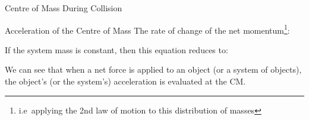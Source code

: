 \documentclass[12pt,compress,aspectratio=169]{beamer}
\begin{document}
\begin{frame}{Centre of Mass During Collision}
\begin{center}
    \vspace{.3in}
  \end{center}
\end{frame}


\begin{frame}{Acceleration of the Centre of Mass}
  The rate of change of the net momentum\footnote{i.e\ applying the 2nd law of
  motion to this distribution of masses}:
  

  If the system mass is constant, then this equation reduces to:

  
  We can see that when a net force is applied to an object (or a system of
  objects), the object's (or the system's)  acceleration is evaluated at the
  CM.
  \vspace{.3in}
\end{frame}



\end{document}
